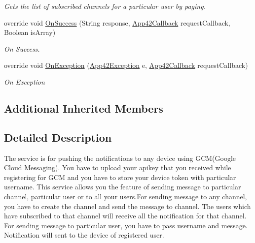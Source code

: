 \begin{DoxyCompactItemize}
\begin{DoxyCompactList}\small\item\em Gets the list of subscribed channels for a particular user by paging. \end{DoxyCompactList}\item 
override void \hyperlink{classcom_1_1shephertz_1_1app42_1_1paas_1_1sdk_1_1windows_1_1push_1_1_push_notification_service_a7c77b76932a90ca2756d81a1f62d16b4}{On\+Success} (String response, \hyperlink{interfacecom_1_1shephertz_1_1app42_1_1paas_1_1sdk_1_1windows_1_1_app42_callback}{App42\+Callback} request\+Callback, Boolean is\+Array)
\begin{DoxyCompactList}\small\item\em On Success. \end{DoxyCompactList}\item 
override void \hyperlink{classcom_1_1shephertz_1_1app42_1_1paas_1_1sdk_1_1windows_1_1push_1_1_push_notification_service_a0128908b3af7a5cd2b6df6ee425c25cf}{On\+Exception} (\hyperlink{classcom_1_1shephertz_1_1app42_1_1paas_1_1sdk_1_1windows_1_1_app42_exception}{App42\+Exception} e, \hyperlink{interfacecom_1_1shephertz_1_1app42_1_1paas_1_1sdk_1_1windows_1_1_app42_callback}{App42\+Callback} request\+Callback)
\begin{DoxyCompactList}\small\item\em On Exception \end{DoxyCompactList}\end{DoxyCompactItemize}
\subsection*{Additional Inherited Members}


\subsection{Detailed Description}
The service is for pushing the notifications to any device using G\+C\+M(Google Cloud Messaging). You have to upload your apikey that you received while registering for G\+C\+M and you have to store your device token with particular username. This service allows you the feature of sending message to particular channel, particular user or to all your users.\+For sending message to any channel, you have to create the channel and send the message to channel. The users which have subscribed to that channel will receive all the notification for that channel. For sending message to particular user, you have to pass username and message. Notification will sent to the device of registered user. 




